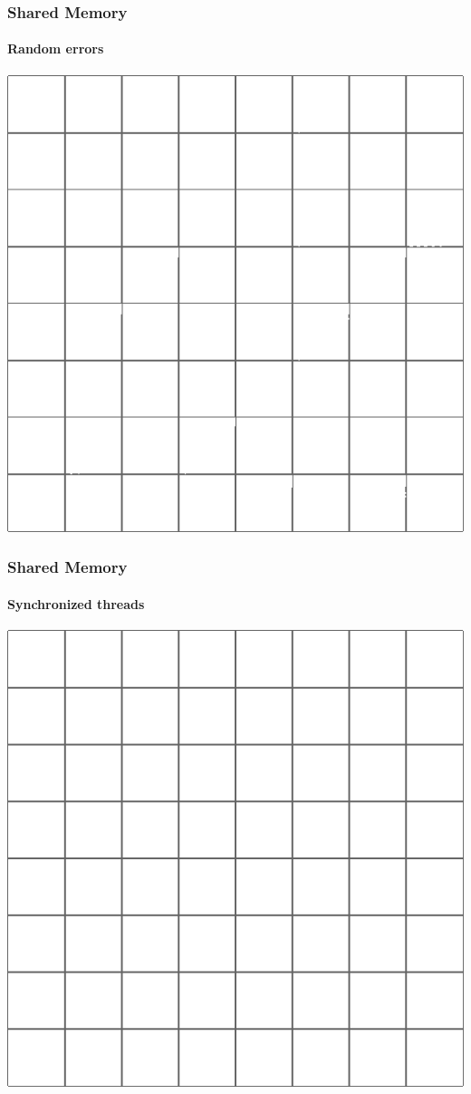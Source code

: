 \begin{frame}
\frametitle{Shared Memory}
\framesubtitle{Random errors}
\begin{center}
\includegraphics[scale=0.4]{../check/borders_1c_01.png}
\end{center}
\end{frame}


\begin{frame}
\frametitle{Shared Memory}
\framesubtitle{Synchronized threads}
\begin{center}
\includegraphics[scale=0.4]{../check/borders_sync.png}
\end{center}
\end{frame}

